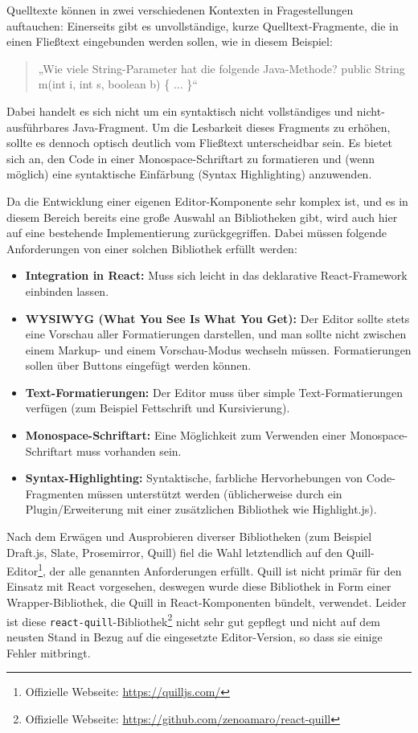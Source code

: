 Quelltexte können in zwei verschiedenen Kontexten in Fragestellungen auftauchen: Einerseits gibt es unvollständige, kurze Quelltext-Fragmente, die in einen Fließtext eingebunden werden sollen, wie in diesem Beispiel:

\begin{quote}
„Wie viele String-Parameter hat die folgende Java-Methode?\newline
public String m(int i, int s, boolean b) \{ ... \}“
\end{quote}

Dabei handelt es sich nicht um ein syntaktisch nicht vollständiges und nicht-ausführbares Java-Fragment. Um die Lesbarkeit dieses Fragments zu erhöhen, sollte es dennoch optisch deutlich vom Fließtext unterscheidbar sein. Es bietet sich an, den Code in einer Monospace-Schriftart zu formatieren und (wenn möglich) eine syntaktische Einfärbung (Syntax Highlighting) anzuwenden.

Da die Entwicklung einer eigenen Editor-Komponente sehr komplex ist, und es in diesem Bereich bereits eine große Auswahl an Bibliotheken gibt, wird auch hier auf eine bestehende Implementierung zurückgegriffen. Dabei müssen folgende Anforderungen von einer solchen Bibliothek erfüllt werden:

\begin{itemize}
    \item \textbf{Integration in React:}  Muss sich leicht in das deklarative React-Framework einbinden lassen.
    \item \textbf{WYSIWYG (What You See Is What You Get):} Der Editor sollte stets eine Vorschau aller Formatierungen darstellen, und man sollte nicht zwischen einem Markup- und einem Vorschau-Modus wechseln müssen. Formatierungen sollen über Buttons eingefügt werden können.
    \item \textbf{Text-Formatierungen:} Der Editor muss über simple Text-Formatierungen verfügen (zum Beispiel Fettschrift und Kursivierung).
    \item \textbf{Monospace-Schriftart:} Eine Möglichkeit zum Verwenden einer Monospace-Schriftart muss vorhanden sein.
    \item \textbf{Syntax-Highlighting:} Syntaktische, farbliche Hervorhebungen von Code-Fragmenten müssen unterstützt werden (üblicherweise durch ein Plugin/Erweiterung mit einer zusätzlichen Bibliothek wie Highlight.js).
\end{itemize}

Nach dem Erwägen und Ausprobieren diverser Bibliotheken (zum Beispiel Draft.js, Slate, Prosemirror, Quill) fiel die Wahl letztendlich auf den Quill-Editor\footnote{Offizielle Webseite: \url{https://quilljs.com/}}, der alle genannten Anforderungen erfüllt. Quill ist nicht primär für den Einsatz mit React vorgesehen, deswegen wurde diese Bibliothek in Form einer Wrapper-Bibliothek, die Quill in React-Komponenten bündelt, verwendet. Leider ist diese \texttt{react-quill}-Bibliothek\footnote{Offizielle Webseite: \url{https://github.com/zenoamaro/react-quill}} nicht sehr gut gepflegt und nicht auf dem neusten Stand in Bezug auf die eingesetzte Editor-Version, so dass sie einige Fehler mitbringt.

